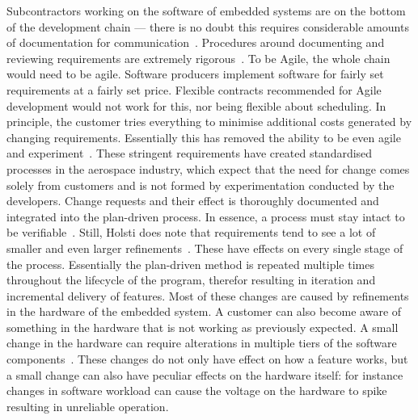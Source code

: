 \documentclass[english]{tktltiki2}
\begin{document}
Subcontractors working on the software of embedded systems are on the bottom of the development chain — there is no doubt this requires considerable amounts of documentation for communication~\cite{BT15, Hol15b}. Procedures around documenting and reviewing requirements are extremely rigorous~\cite{Hol15b}. To be Agile, the whole chain would need to be agile. Software producers implement software for fairly set requirements at a fairly set price. Flexible contracts recommended for Agile development would not work for this, nor being flexible about scheduling. In principle, the customer tries everything to minimise additional costs generated by changing requirements. Essentially this has removed the ability to be even agile and experiment~\cite{Hol15b}. These stringent requirements have created standardised processes in the aerospace industry, which expect that the need for change comes solely from customers and is not formed by experimentation conducted by the developers. Change requests and their effect is thoroughly documented and integrated into the plan-driven process. In essence, a process must stay intact to be verifiable~\cite{Hol15b}. Still, Holsti does note that requirements tend to see a lot of smaller and even larger refinements~\cite{Hol15b}. These have effects on every single stage of the process. Essentially the plan-driven method is repeated multiple times throughout the lifecycle of the program, therefor resulting in iteration and incremental delivery of features. Most of these changes are caused by refinements in the hardware of the embedded system. A customer can also become aware of something in the hardware that is not working as previously expected. A small change in the hardware can require alterations in multiple tiers of the software components~\cite{Hol15b}. These changes do not only have effect on how a feature works, but a small change can also have peculiar effects on the hardware itself: for instance changes in software workload can cause the voltage on the hardware to spike resulting in unreliable operation.
\end{document}
